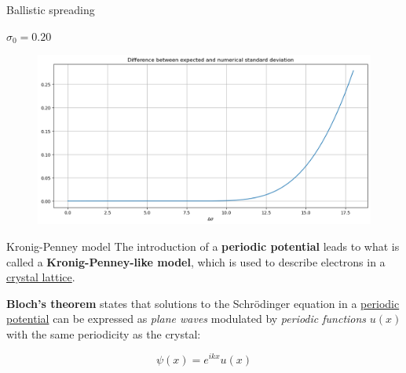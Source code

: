 \begin{frame}{Ballistic spreading}
{\begin{minipage}{0.31\textwidth}
\begin{figure}
        \end{figure}
    \end{minipage}
    \hfill
    \begin{minipage}{0.31\textwidth}
        \begin{center}
            $\sigma_0=0.20$
        \end{center}
        \vspace{-0.25cm}
        \begin{figure}
            \centering
            \includegraphics[width=\textwidth]{Immagini/plot-sigma-diff-2.png}
        \end{figure}
    \end{minipage}

    \vspace{-0.15cm}

    \begin{figure}[H]
        \centering
    \end{figure}}
\end{frame}

\begin{frame}{Kronig-Penney model}
    The introduction of a \textbf{periodic potential} leads to what is called a \textcolor{BrickRed}{\textbf{Kronig-Penney-like model}}, which is used to describe electrons in a \underline{crystal lattice}.

    \pause

    \begin{center}
      \begin{framed}
        \textcolor{BrickRed}{\textbf{Bloch's theorem}} states that solutions to the Schrödinger equation in a \underline{periodic potential} can be expressed as \textit{plane waves} modulated by \textit{periodic functions} $u(x)$ with the same periodicity as the crystal:

        \begin{equation*}
            \psi(x)=e^{ikx}u(x)
        \end{equation*}
      \end{framed}
   \end{center}
\end{frame}

